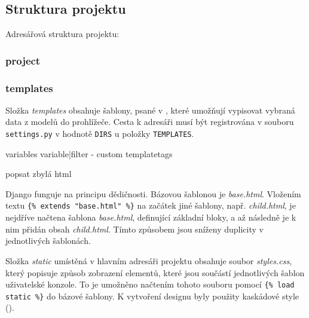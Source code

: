 \subsection{Struktura projektu}
Adresářová struktura projektu:


\subsubsection{project}

\subsubsection{templates}
Složka \textit{templates} obsahuje šablony, psané v , které umožňují vypisovat vybraná data z modelů do prohlížeče. Cesta k adresáři musí být registrována v souboru \texttt{settings.py} v hodnotě \texttt{DIRS} u položky \texttt{TEMPLATES}.

{{ variables }}
{{ variable|filter }}
- custom templatetags

popsat zbylá html

Django funguje na principu dědičnosti. Bázovou šablonou je \textit{base.html}. Vložením textu \texttt{\{\% extends "base.html" \%\}} na začátek jiné šablony, např. \textit{child.html}, je nejdříve načtena šablona \textit{base.html}, definující základní bloky, a až následně je k nim přidán obsah \textit{child.html}. Tímto způsobem jsou sníženy duplicity v jednotlivých šablonách. 

Složka \textit{static} umístěná v hlavním adresáři projektu obsahuje soubor \textit{styles.css}, který popisuje způsob zobrazení elementů, které jsou součástí jednotlivých šablon uživatelské konzole. To je umožněno načtením tohoto souboru pomocí \texttt{\{\% load static \%\}} do bázové šablony. K vytvoření designu byly použity kaskádové style ().

